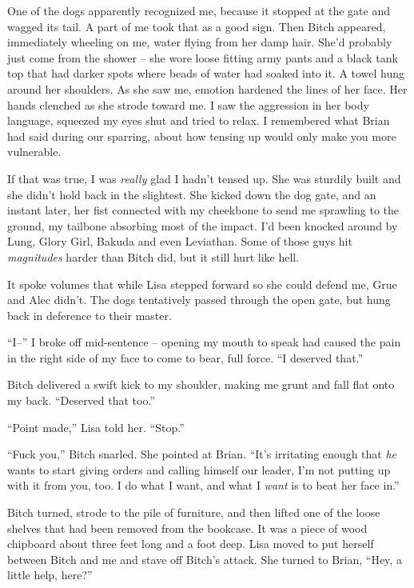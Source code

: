 One of the dogs apparently recognized me, because it stopped at the gate and wagged its tail.  A part of me took that as a good sign.  Then Bitch appeared, immediately wheeling on me, water flying from her damp hair.  She'd probably just come from the shower – she wore loose fitting army pants and a black tank top that had darker spots where beads of water had soaked into it.  A towel hung around her shoulders.  As she saw me, emotion hardened the lines of her face.  Her hands clenched as she strode toward me.  I saw the aggression in her body language, squeezed my eyes shut and tried to relax.  I remembered what Brian had said during our sparring, about how tensing up would only make you more vulnerable.



If that was true, I was \emph{really} glad I hadn't tensed up.  She was sturdily built and she didn't hold back in the slightest.  She kicked down the dog gate, and an instant later, her fist connected with my cheekbone to send me sprawling to the ground, my tailbone absorbing most of the impact.  I'd been knocked around by Lung, Glory Girl, Bakuda and even Leviathan.  Some of those guys hit \emph{magnitudes} harder than Bitch did, but it still hurt like hell.



It spoke volumes that while Lisa stepped forward so she could defend me, Grue and Alec didn't.  The dogs tentatively passed through the open gate, but hung back in deference to their master.



``I--'' I broke off mid-sentence – opening my mouth to speak had caused the pain in the right side of my face to come to bear, full force.  ``I deserved that.''



Bitch delivered a swift kick to my shoulder, making me grunt and fall flat onto my back.  ``Deserved that too.''



``Point made,'' Lisa told her. ``Stop.''



``Fuck you,'' Bitch snarled.  She pointed at Brian.  ``It's irritating enough that \emph{he} wants to start giving orders and calling himself our leader, I'm not putting up with it from you, too.  I do what I want, and what I \emph{want} is to beat her face in.''



Bitch turned, strode to the pile of furniture, and then lifted one of the loose shelves that had been removed from the bookcase.  It was  a piece of wood chipboard about three feet long and a foot deep.  Lisa moved to put herself between Bitch and me and stave off Bitch's attack.  She turned to Brian, ``Hey, a little help, here?''



